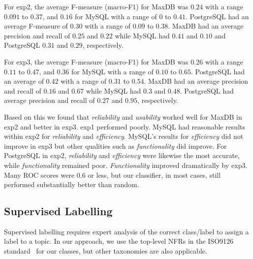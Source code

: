 \documentclass[smallextended]{svjour3}       %
\begin{document}
For \textsf{exp2}, the average F-measure (macro-F1) for MaxDB was  $0.24$ with a range $0.091$ to
$0.37$, and $0.16$ for MySQL with a range of $0$ to $0.41$. PostgreSQL had an average F-measure of $0.30$ %
 with a range of $0.09$ to $0.38$.
MaxDB had an average precision and recall of $0.25$ and $0.22$
while MySQL had $0.41$ and $0.10$ and PostgreSQL $0.31$ and $0.29$, respectively.

For \textsf{exp3}, the average F-measure (macro-F1) for MaxDB was $0.26$ with a range $0.11$ to
$0.47$, and $0.36$ for MySQL with a range of $0.10$ to $0.65$. 
PostgreSQL had an average of $0.42$ with a range of $0.31$ to $0.54$.
MaxDB had an average precision and recall of $0.16$ and $0.67$
while MySQL had $0.3$ and $0.48$. PostgreSQL had average precision and recall of $0.27$ and $0.95$, respectively.

Based on this we found that \emph{reliability} and
\emph{usability} worked well for MaxDB in \textsf{exp2} and better in
\textsf{exp3}. 
\textsf{exp1} performed poorly.
MySQL had reasonable results within \textsf{exp2} for \emph{reliability} and \emph{efficiency}. 
MySQL's results for \emph{efficiency} did not improve in \textsf{exp3}
but other qualities such as \emph{functionality} did improve. 
For PostgreSQL in \textsf{exp2}, \emph{reliability} and \emph{efficiency} were likewise the most accurate,
while \emph{functionality} remained poor. \emph{Functionality} improved dramatically by \textsf{exp3}.
Many ROC scores were $0.6$ or less, but our classifier, in most cases, still performed substantially better than random.

\subsection{Supervised Labelling}
\label{sec:suplabelling}
Supervised labelling requires expert analysis of the correct
class/label to assign a label to a topic. In our approach, we use the top-level NFRs in the ISO9126 standard~\cite{iso9126} for our classes, but other
taxonomies are also applicable.%
\end{document}

